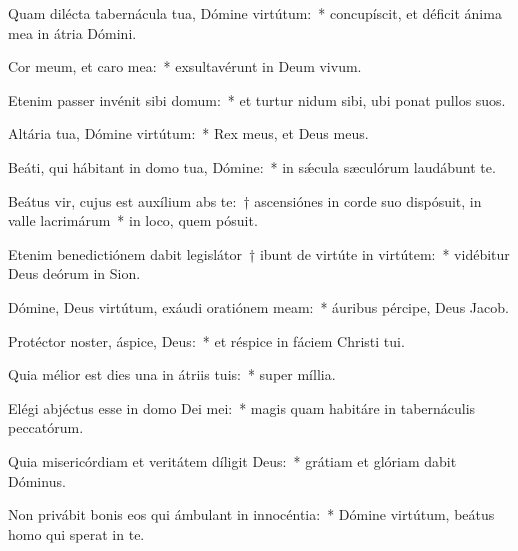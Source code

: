 \item Quam dilécta tabernácula tua, Dómine virtútum:~* concupíscit, et déficit ánima mea in átria Dómini.

\item Cor meum, et caro mea:~* exsultavérunt in Deum vivum.

\item Etenim passer invénit sibi domum:~* et turtur nidum sibi, ubi ponat pullos suos.

\item Altária tua, Dómine virtútum:~* Rex meus, et Deus meus.

\item Beáti, qui hábitant in domo tua, Dómine:~* in sǽcula sæculórum laudábunt te.

\item Beátus vir, cujus est auxílium abs te:~† ascensiónes in corde suo dispósuit, in valle lacrimárum~* in loco, quem pósuit.

\item Etenim benedictiónem dabit legislátor~† ibunt de virtúte in virtútem:~* vidébitur Deus deórum in Sion.

\item Dómine, Deus virtútum, exáudi oratiónem meam:~* áuribus pércipe, Deus Jacob.

\item Protéctor noster, áspice, Deus:~* et réspice in fáciem Christi tui.

\item Quia mélior est dies una in átriis tuis:~* super míllia.

\item Elégi abjéctus esse in domo Dei mei:~* magis quam habitáre in tabernáculis peccatórum.

\item Quia misericórdiam et veritátem díligit Deus:~* grátiam et glóriam dabit Dóminus.

\item Non privábit bonis eos qui ámbulant in innocéntia:~* Dómine virtútum, beátus homo qui sperat in te.
